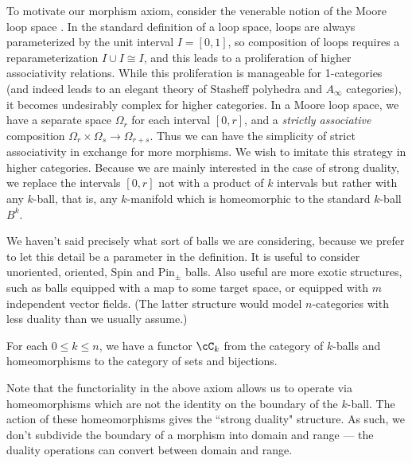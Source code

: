 \documentclass{pnastwo}
\begin{document}
\begin{article}
To motivate our morphism axiom, consider the venerable notion of the Moore loop space
\cite[\S 2.2]{MR505692}.
In the standard definition of a loop space, loops are always parameterized by the unit interval $I = [0,1]$,
so composition of loops requires a reparameterization $I\cup I \cong I$, and this leads to a proliferation
of higher associativity relations.
While this proliferation is manageable for 1-categories (and indeed leads to an elegant theory
of Stasheff polyhedra and $A_\infty$ categories), it becomes undesirably complex for higher categories.
In a Moore loop space, we have a separate space $\Omega_r$ for each interval $[0,r]$, and a 
{\it strictly associative} composition $\Omega_r\times \Omega_s\to \Omega_{r+s}$.
Thus we can have the simplicity of strict associativity in exchange for more morphisms.
We wish to imitate this strategy in higher categories.
Because we are mainly interested in the case of strong duality, we replace the intervals $[0,r]$ not with
a product of $k$ intervals  but rather with any $k$-ball, that is, any $k$-manifold which is homeomorphic
to the standard $k$-ball $B^k$.

We haven't said precisely what sort of balls we are considering,
because we prefer to let this detail be a parameter in the definition.
It is useful to consider unoriented, oriented, Spin and $\mbox{Pin}_\pm$ balls.
Also useful are more exotic structures, such as balls equipped with a map to some target space,
or equipped with $m$ independent vector fields.
(The latter structure would model $n$-categories with less duality than we usually assume.)


\begin{axiom}[Morphisms]
\label{axiom:morphisms}
For each $0 \le k \le n$, we have a functor $\cC_k$ from 
the category of $k$-balls and 
homeomorphisms to the category of sets and bijections.
\end{axiom}

Note that the functoriality in the above axiom allows us to operate via
homeomorphisms which are not the identity on the boundary of the $k$-ball.
The action of these homeomorphisms gives the ``strong duality" structure.
As such, we don't subdivide the boundary of a morphism
into domain and range --- the duality operations can convert between domain and range.


\end{article}
\end{document}
